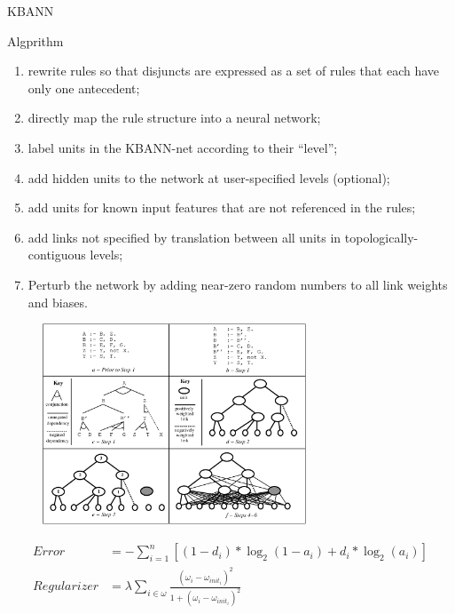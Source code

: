 \documentclass[presentation]{beamer}\mode<presentation>{\usetheme{AMSBolognaFC}}
\begin{document}
\begin{frame}[allowframebreaks]{KBANN}
    \begin{block}{Algprithm}
        \begin{enumerate}
            \item rewrite rules so that disjuncts are expressed as a set of rules that each have only one antecedent;
            \item directly map the rule structure into a neural network;
            \item label units in the KBANN-net according to their ``level'';
            \item add hidden units to the network at user-specified levels (optional);
            \item add units for known input features that are not referenced in the rules;
            \item add links not specified by translation between all units in topologically-contiguous levels;
            \item Perturb the network by adding near-zero random numbers to all link weights and biases.
        \end{enumerate}
    \end{block}
    
    \framebreak
    
    \begin{figure}
        \centering
        \includegraphics[width=0.7\textwidth]{figures/kbann-algorithm.png}
    \end{figure}
    
    \framebreak
    
    \begin{equation*}
        \begin{aligned}
            \textit{Error}&= - \sum_{i=1}^{n}{[(1-d_{i})*\log_{2}{(1-a_{i})} + d_{i}*\log_{2}{(a_{i})}]}\\
            \textit{Regularizer}&=\lambda\sum_{i\in\omega}{\frac{(\omega_{i} - \omega_{init_{i}})^{2}}{1+(\omega_{i}- \omega_{init_{i}})^{2}}}
        \end{aligned}
    \end{equation*}
\end{frame}
\end{document}
